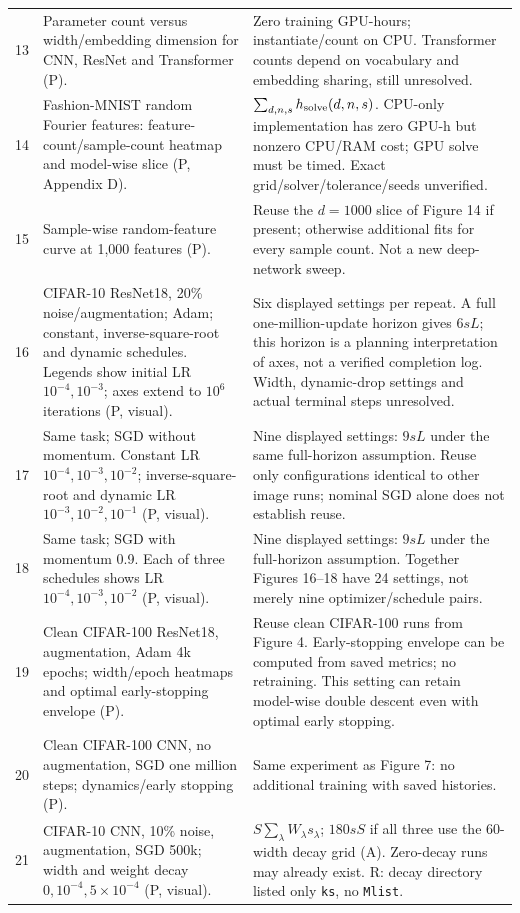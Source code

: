 \documentclass{article}
\begin{document}
\begin{longtable}{@{}P{0.32in}P{3.47in}P{2.9in}@{}}
13 & Parameter count versus width/embedding dimension for CNN, ResNet and Transformer (P). & Zero training GPU-hours; instantiate/count on CPU. Transformer counts depend on vocabulary and embedding sharing, still unresolved.\\
14 & Fashion-MNIST random Fourier features: feature-count/sample-count heatmap and model-wise slice (P, Appendix D). & $\sum_{d,n,s}h_{\rm solve}(d,n,s)$. CPU-only implementation has zero GPU-h but nonzero CPU/RAM cost; GPU solve must be timed. Exact grid/solver/tolerance/seeds unverified.\\
15 & Sample-wise random-feature curve at 1,000 features (P). & Reuse the $d=1000$ slice of Figure 14 if present; otherwise additional fits for every sample count. Not a new deep-network sweep.\\
16 & CIFAR-10 ResNet18, 20\% noise/augmentation; Adam; constant, inverse-square-root and dynamic schedules. Legends show initial LR $10^{-4},10^{-3}$; axes extend to $10^6$ iterations (P, visual). & Six displayed settings per repeat. A full one-million-update horizon gives $6sL$; this horizon is a planning interpretation of axes, not a verified completion log. Width, dynamic-drop settings and actual terminal steps unresolved.\\
17 & Same task; SGD without momentum. Constant LR $10^{-4},10^{-3},10^{-2}$; inverse-square-root and dynamic LR $10^{-3},10^{-2},10^{-1}$ (P, visual). & Nine displayed settings: $9sL$ under the same full-horizon assumption. Reuse only configurations identical to other image runs; nominal SGD alone does not establish reuse.\\
18 & Same task; SGD with momentum 0.9. Each of three schedules shows LR $10^{-4},10^{-3},10^{-2}$ (P, visual). & Nine displayed settings: $9sL$ under the full-horizon assumption. Together Figures 16--18 have 24 settings, not merely nine optimizer/schedule pairs.\\
19 & Clean CIFAR-100 ResNet18, augmentation, Adam 4k epochs; width/epoch heatmaps and optimal early-stopping envelope (P). & Reuse clean CIFAR-100 runs from Figure 4. Early-stopping envelope can be computed from saved metrics; no retraining. This setting can retain model-wise double descent even with optimal early stopping.\\
20 & Clean CIFAR-100 CNN, no augmentation, SGD one million steps; dynamics/early stopping (P). & Same experiment as Figure 7: no additional training with saved histories.\\
21 & CIFAR-10 CNN, 10\% noise, augmentation, SGD 500k; width and weight decay $0,10^{-4},5\times10^{-4}$ (P, visual). & $S\sum_\lambda W_\lambda s_\lambda$; $180sS$ if all three use the 60-width decay grid (A). Zero-decay runs may already exist. R: decay directory listed only \texttt{ks}, no \texttt{Mlist}.\\

\end{longtable}
\end{document}
